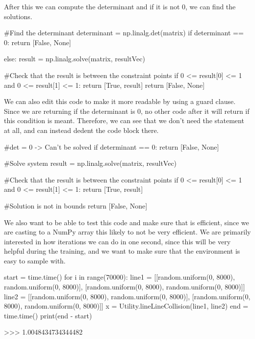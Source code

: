 After this we can compute the determinant and if it is not 0, we can find the solutions.
\begin{mpy}
        #Find the determinant
        determinant = np.linalg.det(matrix)
        if determinant == 0:
            return [False, None]
                    
        else:
            result = np.linalg.solve(matrix, resultVec)
                    
            #Check that the result is between the constraint points
            if 0 <= result[0] <= 1 and 0 <= result[1] <= 1:
                return [True, result]
            return [False, None]
\end{mpy}

We can also edit this code to make it more readable by using a guard clause. Since we are returning if the determinant is 0, no other code after it will return if this condition is meant. Therefore, we can see that we don't need the  statement at all, and can instead dedent the code block there.

\begin{mpy}
        #det = 0 -> Can't be solved
        if determinant == 0:
            return [False, None]

        #Solve system
        result = np.linalg.solve(matrix, resultVec)

        #Check that the result is between the constraint points
        if 0 <= result[0] <= 1 and 0 <= result[1] <= 1:
            return [True, result]
        
        #Solution is not in bounds
        return [False, None]
\end{mpy}

\vs
We also want to be able to test this code and make sure that is efficient, since we are casting to a NumPy array this likely to not be very efficient. We are primarily interested in how iterations we can do in one second, since this will be very helpful during the training, and we want to make sure that the environment is easy to sample with.

\begin{mpy}
start = time.time()
for i in range(70000):
    line1 = [[random.uniform(0, 8000), random.uniform(0, 8000)], [random.uniform(0, 8000), random.uniform(0, 8000)]]
    line2 = [[random.uniform(0, 8000), random.uniform(0, 8000)], [random.uniform(0, 8000), random.uniform(0, 8000)]]
    x = Utility.lineLineCollision(line1, line2)
end = time.time()
print(end - start)

>>> 1.0048434734344482
\end{mpy}

